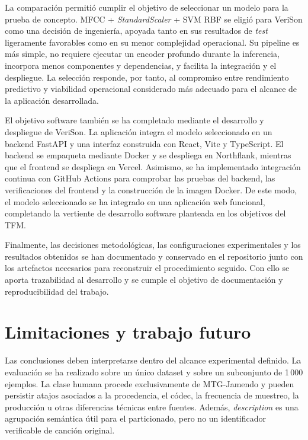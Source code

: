 La comparación permitió cumplir el objetivo de seleccionar un modelo para la prueba de concepto. MFCC + \textit{StandardScaler} + SVM RBF se eligió para VeriSon como una decisión de ingeniería, apoyada tanto en sus resultados de \textit{test} ligeramente favorables como en su menor complejidad operacional. Su pipeline es más simple, no requiere ejecutar un encoder profundo durante la inferencia, incorpora menos componentes y dependencias, y facilita la integración y el despliegue. La selección responde, por tanto, al compromiso entre rendimiento predictivo y viabilidad operacional considerado más adecuado para el alcance de la aplicación desarrollada.

El objetivo software también se ha completado mediante el desarrollo y despliegue de VeriSon. La aplicación integra el modelo seleccionado en un backend FastAPI y una interfaz construida con React, Vite y TypeScript. El backend se empaqueta mediante Docker y se despliega en Northflank, mientras que el frontend se despliega en Vercel. Asimismo, se ha implementado integración continua con GitHub Actions para comprobar las pruebas del backend, las verificaciones del frontend y la construcción de la imagen Docker. De este modo, el modelo seleccionado se ha integrado en una aplicación web funcional, completando la vertiente de desarrollo software planteada en los objetivos del TFM.

Finalmente, las decisiones metodológicas, las configuraciones experimentales y los resultados obtenidos se han documentado y conservado en el repositorio junto con los artefactos necesarios para reconstruir el procedimiento seguido. Con ello se aporta trazabilidad al desarrollo y se cumple el objetivo de documentación y reproducibilidad del trabajo.

\section{Limitaciones y trabajo futuro}

Las conclusiones deben interpretarse dentro del alcance experimental definido. La evaluación se ha realizado sobre un único dataset y sobre un subconjunto de 1\,000 ejemplos. La clase humana procede exclusivamente de MTG-Jamendo y pueden persistir atajos asociados a la procedencia, el códec, la frecuencia de muestreo, la producción u otras diferencias técnicas entre fuentes. Además, \textit{description} es una agrupación semántica útil para el particionado, pero no un identificador verificable de canción original.

